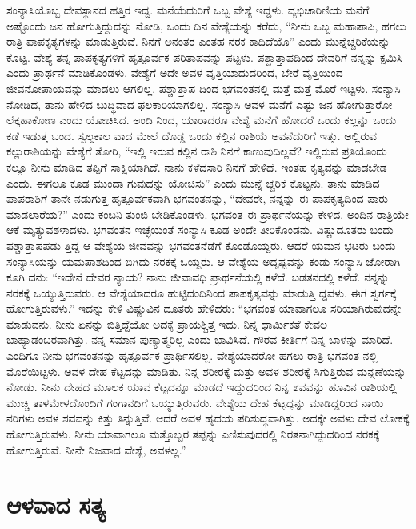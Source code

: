 ಸಂನ್ಯಾಸಿಯೊಬ್ಬ ದೇವಸ್ಥಾನದ ಹತ್ತಿರ ಇದ್ದ. ಮನೆಯೆದುರಿಗೆ ಒಬ್ಬ ವೇಶ್ಯೆ ಇದ್ದಳು. ವ್ಯಭಿಚಾರಿಣಿಯ ಮನೆಗೆ ಅಷ್ಟೊಂದು ಜನ ಹೋಗುತ್ತಿದ್ದುದನ್ನು ನೋಡಿ, ಒಂದು ದಿನ ವೇಶ್ಯೆಯನ್ನು ಕರೆದು, “ನೀನು ಒಬ್ಬ ಮಹಾಪಾಪಿ, ಹಗಲು ರಾತ್ರಿ ಪಾಪಕೃತ್ಯಗಳನ್ನು ಮಾಡುತ್ತಿರುವೆ. ನಿನಗೆ ಅನಂತರ ಎಂತಹ ನರಕ ಕಾದಿದೆಯೊ” ಎಂದು ಮುನ್ನೆಚ್ಚರಿಕೆಯನ್ನು ಕೊಟ್ಟ. ವೇಶ್ಯೆ ತನ್ನ ಪಾಪಕೃತ್ಯಗಳಿಗೆ ಹೃತ್ಪೂರ್ವಕ ಪರಿತಾಪವನ್ನು ಪಟ್ಟಳು. ಪಶ್ಚಾತ್ತಾಪದಿಂದ ದೇವರಿಗೆ ನನ್ನನ್ನು ಕ್ಷಮಿಸಿ ಎಂದು ಪ್ರಾರ್ಥನೆ ಮಾಡಿಕೊಂಡಳು. ವೇಶ್ಯೆಗೆ ಅದೇ ಅವಳ ವೃತ್ತಿಯಾದುದರಿಂದ, ಬೇರೆ ವೃತ್ತಿಯಿಂದ ಜೀವನೋಪಾಯವನ್ನು ಮಾಡಲು ಆಗಲಿಲ್ಲ. ಪಶ್ಚಾತ್ತಾಪ ದಿಂದ ಭಗವಂತನಲ್ಲಿ ಮತ್ತೆ ಮತ್ತೆ ಮೊರೆ ಇಟ್ಟಳು. ಸಂನ್ಯಾಸಿ ನೋಡಿದ, ತಾನು ಹೇಳಿದ ಬುದ್ಧಿವಾದ ಫಲಕಾರಿಯಾಗಲಿಲ್ಲ. ಸಂನ್ಯಾಸಿ ಅವಳ ಮನೆಗೆ ಎಷ್ಟು ಜನ ಹೋಗುತ್ತಾರೋ ಲೆಕ್ಕಹಾಕೋಣ ಎಂದು ಯೋಚಿಸಿದ. ಅಂದಿ ನಿಂದ, ಯಾರಾದರೂ ವೇಶ್ಯೆ ಮನೆಗೆ ಹೋದರೆ ಒಂದು ಕಲ್ಲನ್ನು ಒಂದು ಕಡೆ ಇಡುತ್ತ ಬಂದ. ಸ್ವಲ್ಪಕಾಲ ವಾದ ಮೇಲೆ ದೊಡ್ಡ ಒಂದು ಕಲ್ಲಿನ ರಾಶಿಯೆ ಅವನೆದುರಿಗೆ ಇತ್ತು. ಅಲ್ಲಿರುವ ಕಲ್ಲುರಾಶಿಯನ್ನು ವೇಶ್ಯೆಗೆ ತೋರಿ, “ಇಲ್ಲಿ ಇರುವ ಕಲ್ಲಿನ ರಾಶಿ ನಿನಗೆ ಕಾಣುವುದಿಲ್ಲವೆ? ಇಲ್ಲಿರುವ ಪ್ರತಿಯೊಂದು ಕಲ್ಲೂ ನೀನು ಮಾಡಿದ ತಪ್ಪಿಗೆ ಸಾಕ್ಷಿಯಾಗಿದೆ. ನಾನು ಕಳೆದಸಾರಿ ನಿನಗೆ ಹೇಳಿದೆ. ಇಂತಹ ಕೃತ್ಯವನ್ನು ಮಾಡಬೇಡ ಎಂದು. ಈಗಲೂ ಕೂಡ ಮುಂದಾ ಗುವುದನ್ನು ಯೋಚಿಸು” ಎಂದು ಮುನ್ನೆ ಚ್ಚರಿಕೆ ಕೊಟ್ಟನು. ತಾನು ಮಾಡಿದ ಪಾಪರಾಶಿಗೆ ತಾನೇ ನಡುಗುತ್ತ ಹೃತ್ಪೂರ್ವಕವಾಗಿ ಭಗವಂತನನ್ನು, “ದೇವರೇ, ನನ್ನನ್ನು ಈ ಪಾಪಕೃತ್ಯದಿಂದ ಪಾರು ಮಾಡಲಾರೆಯ?” ಎಂದು ಕಂಬನಿ ತುಂಬಿ ಬೇಡಿಕೊಂಡಳು. ಭಗವಂತ ಈ ಪ್ರಾರ್ಥನೆಯನ್ನು ಕೇಳಿದ. ಅಂದಿನ ರಾತ್ರಿಯೇ ಆಕೆ ಮೃತ್ಯುವಶಳಾದಳು. ಭಗವಂತನ ಇಚ್ಛೆಯಂತೆ ಸಂನ್ಯಾಸಿ ಕೂಡ ಅಂದೇ ತೀರಿಕೊಂಡನು. ವಿಷ್ಣುದೂತರು ಬಂದು ಪಶ್ಚಾತ್ತಾಪಪಡು ತ್ತಿದ್ದ ಆ ವೇಶ್ಯೆಯ ಜೀವವನ್ನು ಭಗವಂತನೆಡೆಗೆ ಕೊಂಡೊಯ್ದರು. ಆದರೆ ಯಮನ ಭಟರು ಬಂದು ಸಂನ್ಯಾಸಿಯನ್ನು ಯಮಪಾಶದಿಂದ ಬಿಗಿದು ನರಕಕ್ಕೆ ಒಯ್ದರು. ಆ ವೇಶ್ಯೆಯ ಅದೃಷ್ಟವನ್ನು ಕಂಡು ಸಂನ್ಯಾಸಿ ಜೋರಾಗಿ ಕೂಗಿ ದನು: “ಇದೇನೆ ದೇವರ ನ್ಯಾಯ? ನಾನು ಜೀವಾವಧಿ ಪ್ರಾರ್ಥನೆಯಲ್ಲಿ ಕಳೆದೆ. ಬಡತನದಲ್ಲಿ ಕಳೆದೆ. ನನ್ನನ್ನು ನರಕಕ್ಕೆ ಒಯ್ಯುತ್ತಿರುವರು. ಆ ವೇಶ್ಯೆಯಾದರೂ ಹುಟ್ಟಿದಂದಿನಿಂದ ಪಾಪಕೃತ್ಯವನ್ನು ಮಾಡುತ್ತಿ ದ್ದವಳು. ಈಗ ಸ್ವರ್ಗಕ್ಕೆ ಹೋಗುತ್ತಿರುವಳು.” ಇದನ್ನು ಕೇಳಿ ವಿಷ್ಣುವಿನ ದೂತರು ಹೇಳಿದರು: “ಭಗವಂತ ಯಾವಾಗಲೂ ಸರಿಯಾಗಿರುವುದನ್ನೇ ಮಾಡುವನು. ನೀನು ಏನನ್ನು ಬಿತ್ತಿದ್ದೆಯೋ ಅದಕ್ಕೆ ಪ್ರಾಯಶ್ಚಿತ್ತ ಇದು. ನಿನ್ನ ಧಾರ್ಮಿಕತೆ ಕೇವಲ ಬಾಹ್ಯಾಡಂಬರವಾಗಿತ್ತು. ನನ್ನ ಸಮಾನ ಪುಣ್ಯಾತ್ಮರಿಲ್ಲ ಎಂದು ಭಾವಿಸಿದೆ. ಗೌರವ ಕೀರ್ತಿಗೆ ನಿನ್ನ ಬಾಳನ್ನು ಮಾರಿದೆ. ಎಂದಿಗೂ ನೀನು ಭಗವಂತನನ್ನು ಹೃತ್ಪೂರ್ವಕ ಪ್ರಾರ್ಥಿಸಲಿಲ್ಲ. ವೇಶ್ಯೆಯಾದರೋ ಹಗಲು ರಾತ್ರಿ ಭಗವಂತ ನಲ್ಲಿ ಮೊರೆಯಿಟ್ಟಳು. ಅವಳ ದೇಹ ಕೆಟ್ಟದನ್ನು ಮಾಡಿತು. ನಿನ್ನ ಶರೀರಕ್ಕೆ ಮತ್ತು ಅವಳ ಶರೀರಕ್ಕೆ ಸಿಗುತ್ತಿರುವ ಮನ್ನಣೆಯನ್ನು ನೋಡು. ನೀನು ದೇಹದ ಮೂಲಕ ಯಾವ ಕೆಟ್ಟದನ್ನೂ ಮಾಡದೆ ಇದ್ದುದರಿಂದ ನಿನ್ನ ಶವವನ್ನು ಹೂವಿನ ರಾಶಿಯಲ್ಲಿ ಮುಚ್ಚಿ ತಾಳಮೇಳದೊಂದಿಗೆ ಗಂಗಾನದಿಗೆ ಒಯ್ಯುತ್ತಿರುವರು. ವೇಶ್ಯೆಯ ದೇಹ ಕೆಟ್ಟದ್ದನ್ನು ಮಾಡಿದ್ದರಿಂದ ನಾಯಿ ನರಿಗಳು ಅವಳ ಶವವನ್ನು ಕಿತ್ತು ತಿನ್ನುತ್ತಿವೆ. ಆದರೆ ಅವಳ ಹೃದಯ ಪರಿಶುದ್ಧವಾಗಿತ್ತು. ಅದಕ್ಕೇ ಅವಳು ದೇವ ಲೋಕಕ್ಕೆ ಹೋಗುತ್ತಿರುವಳು. ನೀನು ಯಾವಾಗಲೂ ಮತ್ತೊಬ್ಬರ ತಪ್ಪನ್ನು ಎಣಿಸುವುದರಲ್ಲಿ ನಿರತನಾಗಿದ್ದುದರಿಂದ ನರಕಕ್ಕೆ ಹೋಗುತ್ತಿರುವೆ. ನೀನೇ ನಿಜವಾದ ವೇಶ್ಯೆ, ಅವಳಲ್ಲ.”

\chapter{ಆಳವಾದ ಸತ್ಯ}

